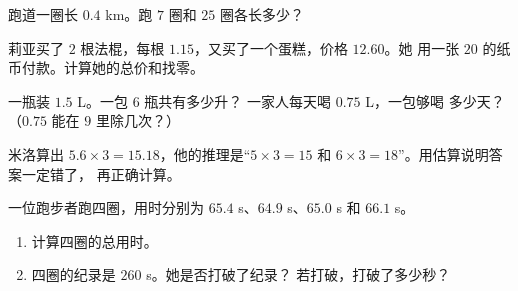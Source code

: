 \begin{exercise}[$\star$]\label{exo:g5:decimalops:7}
跑道一圈长 $0.4$ km。跑 $7$ 圈和
$25$ 圈各长多少？
\end{exercise}

\begin{exercise}[$\star$]\label{exo:g5:decimalops:8}
莉亚买了 $2$ 根法棍，每根 $1.15$，又买了一个蛋糕，价格 $12.60$。她
用一张 $20$ 的纸币付款。计算她的总价和找零。
\end{exercise}

\begin{exercise}[$\star$]\label{exo:g5:decimalops:9}
一瓶装 $1.5$ L。一包 $6$ 瓶共有多少升？
一家人每天喝 $0.75$ L，一包够喝
多少天？（$0.75$ 能在 $9$ 里除几次？）
\end{exercise}

\begin{exercise}[$\star\star$]\label{exo:g5:decimalops:10}
米洛算出 $5.6 \times 3 = 15.18$，他的推理是“$5 \times 3 = 15$
和 $6 \times 3 = 18$”。用估算说明答案一定错了，
再正确计算。
\end{exercise}

\begin{exercise}[$\star\star$]\label{exo:g5:decimalops:11}
一位跑步者跑四圈，用时分别为 $65.4$ s、$64.9$ s、$65.0$ s 和
$66.1$ s。
\begin{enumerate}
  \item 计算四圈的总用时。
  \item 四圈的纪录是 $260$ s。她是否打破了纪录？
        若打破，打破了多少秒？
\end{enumerate}
\end{exercise}
